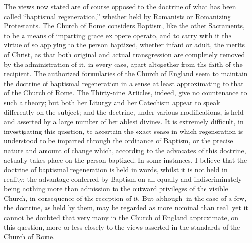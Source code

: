 \documentclass[]{book}
\begin{document}
The views now stated are of course opposed to the doctrine of what has been called ``baptismal regeneration,'' whether held by Romanists or Romanizing Protestants. The Church of Rome considers Baptism, like the other Sacraments, to be a means of imparting grace ex opere operato, and to carry with it the virtue of so applying to the person baptized, whether infant or adult, the merits of Christ, as that both original and actual transgression are completely removed by the administration of it, in every case, apart altogether from the faith of the recipient. The authorized formularies of the Church of England seem to maintain the doctrine of baptismal regeneration in a sense at least approximating to that of the Church of Rome. The Thirty-nine Articles, indeed, give no countenance to such a theory; but both her Liturgy and her Catechism appear to speak differently on the subject; and the doctrine, under various modifications, is held and asserted by a large number of her ablest divines. It is extremely difficult, in investigating this question, to ascertain the exact sense in which regeneration is understood to be imparted through the ordinance of Baptism, or the precise nature and amount of change which, according to the advocates of this doctrine, actually takes place on the person baptized. In some instances, I believe that the doctrine of baptismal regeneration is held in words, whilst it is not held in reality; the advantage conferred by Baptism on all equally and indiscriminately being nothing more than admission to the outward privileges of the visible Church, in consequence of the reception of it. But although, in the case of a few, the doctrine, as held by them, may be regarded as more nominal than real, yet it cannot be doubted that very many in the Church of England approximate, on this question, more or less closely to the views asserted in the standards of the Church of Rome.
\end{document}
